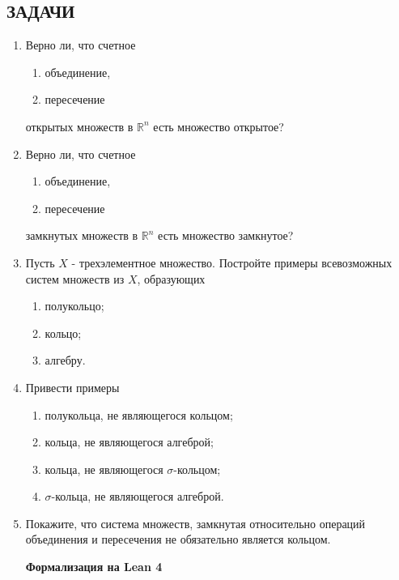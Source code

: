 \documentclass[12pt,a4paper]{article}
\begin{document}
\subsection*{ЗАДАЧИ}
\begin{enumerate}
  \item Верно ли, что счетное
  \begin{enumerate}[label=\alph*)]
    \item объединение,
    \item пересечение
  \end{enumerate}
  открытых множеств в $\mathbb{R}^{n}$ есть множество открытое?

\item Верно ли, что счетное
\begin{enumerate}[label=\alph*)]
  \item объединение,
  \item пересечение
\end{enumerate}
замкнутых множеств в $\mathbb{R}^{n}$ есть множество замкнутое?

\item Пусть $X$ - трехэлементное множество. Постройте примеры всевозможных систем множеств из $X$, образующих
\begin{enumerate}[label=\alph*)]
\item полукольцо;
\item кольцо;
\item алгебру.
\end{enumerate}

\item Привести примеры
\begin{enumerate}[label=\alph*)]
\item полукольца, не являющегося кольцом;
\item кольца, не являющегося алгеброй;
\item кольца, не являющегося $\sigma$-кольцом;
\item $\sigma$-кольца, не являющегося алгеброй.
\end{enumerate}

\newpage
\item Покажите, что система множеств, замкнутая относительно операций объединения и пересечения не обязательно является кольцом.

\begin{center}\small\textbf{Формализация на Lean 4}\end{center}
\inputminted{lean}{FunAn/Section01_SetAlgebra/Task05.lean}


\end{enumerate}
\end{document}
